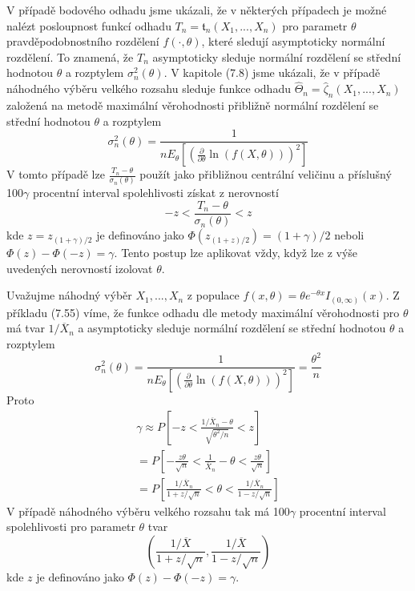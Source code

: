 V případě bodového odhadu jsme ukázali, že v některých případech je možné nalézt posloupnost funkcí odhadu $T_n = \mathfrak{t}_n(X_1, ..., X_n)$ pro parametr $\theta$ pravděpodobnostního rozdělení $f(\cdot, \theta)$, které sledují asymptoticky normální rozdělení. To znamená, že $T_n$ asymptoticky sleduje normální rozdělení se střední hodnotou $\theta$ a rozptylem $\sigma_n^2(\theta)$. V kapitole (7.8) jsme ukázali, že v případě náhodného výběru velkého rozsahu sleduje funkce odhadu $\hat{\Theta}_n = \hat{\zeta}_n (X_1, ..., X_n)$ založená na metodě maximální věrohodnosti přibližně normální rozdělení se střední hodnotou $\theta$ a rozptylem
\begin{equation*}
\sigma_n^2(\theta) = \frac{1}{n E_{\theta}\left[\left(\frac{\partial}{\partial \theta}\ln\left(f(X, \theta)\right) \right)^2 \right]}
\end{equation*}
V tomto případě lze $\frac{T_n - \theta}{\sigma_n(\theta)}$ použít jako přibližnou centrální veličinu a příslušný 100$\gamma$ procentní interval spolehlivosti získat z nerovností
\begin{equation*}
-z < \frac{T_n - \theta}{\sigma_n(\theta)} < z
\end{equation*}
kde $z = z_{(1 + \gamma)/2}$ je definováno jako $\Phi(z_{(1 + z) / 2}) = (1 + \gamma) / 2$ neboli $\Phi(z) - \Phi(-z) = \gamma$. Tento postup lze aplikovat vždy, když lze z výše uvedených nerovností izolovat $\theta$.

\begin{example}
Uvažujme náhodný výběr $X_1, ..., X_n$ z populace $f(x, \theta) = \theta e^{-\theta x}I_{(0, \infty)}(x)$. Z příkladu (7.55) víme, že funkce odhadu dle metody maximální věrohodnosti pro $\theta$ má tvar $1 / \overline{X}_n$ a asymptoticky sleduje normální rozdělení se střední hodnotou $\theta$ a rozptylem
\begin{equation*}
\sigma_n^2(\theta) = \frac{1}{n E_{\theta}\left[\left(\frac{\partial}{\partial \theta} \ln \left(f(X, \theta)\right)\right)^2\right]} = \frac{\theta^2}{n}
\end{equation*}
Proto
\begin{gather*}
\gamma \approx P\left[-z < \frac{1 / \overline{X}_n - \theta}{\sqrt{\theta^2/n}} < z \right]\\
= P\left[-\frac{z \theta}{\sqrt{n}} < \frac{1}{\overline{X}_n} - \theta < \frac{z \theta}{\sqrt{n}} \right]\\
= P\left[\frac{1 / \overline{X}_n}{1 + z/\sqrt{n}} < \theta < \frac{1 / \overline{X}_n}{1 - z / \sqrt{n}} \right]
\end{gather*}
V případě náhodného výběru velkého rozsahu tak má 100$\gamma$ procentní interval spolehlivosti pro parametr $\theta$ tvar
\begin{equation*}
\left(\frac{1 / \overline{X}}{1 + z/\sqrt{n}}, \frac{1 / \overline{X}}{1 - z / \sqrt{n}}\right)
\end{equation*}
kde $z$ je definováno jako $\Phi(z) - \Phi(-z) = \gamma$.
\end{example}

